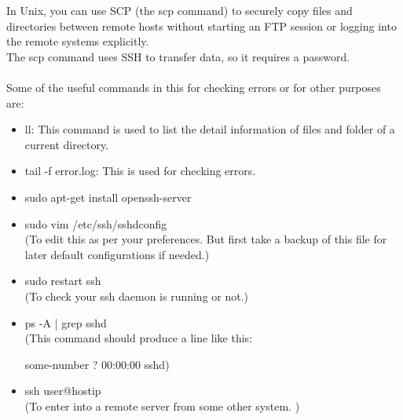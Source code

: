 In Unix, you can use SCP (the scp command) to securely copy files and directories between remote hosts without starting an FTP session or logging into the remote systems explicitly. \\
The scp command uses SSH to transfer data, so it requires a password.\\\\
Some of the useful commands in this for checking errors or for other purposes are: \\
\begin{itemize}
\item ll: This command is used to list the detail information of files and folder of a current directory. 
\item tail -f error.log: This is used for checking errors.
\item sudo apt-get install openssh-server
\item sudo vim /etc/ssh/sshdconfig \\
(To edit this as per your preferences. But first take a backup of this file for later default configurations if needed.)
\item sudo restart ssh \\
(To check your ssh daemon is running or not.)
\item ps -A | grep sshd \\
(This command should produce a line like this:

 some-number ? 00:00:00 sshd)
\item ssh user@hostip \\
(To enter into a remote server from some other system. )
\end{itemize}

 
